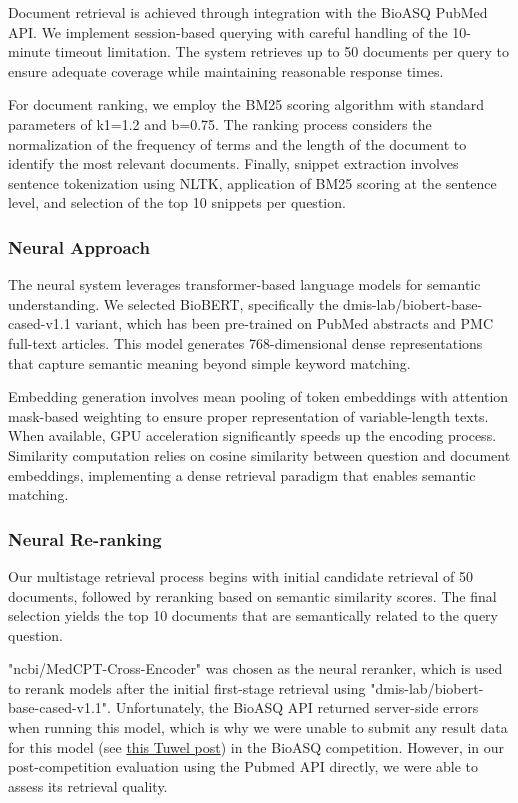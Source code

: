 \documentclass[12pt]{article}
\begin{document}
Document retrieval is achieved through integration with the BioASQ PubMed API. We implement session-based querying with careful handling of the 10-minute timeout limitation. The system retrieves up to 50 documents per query to ensure adequate coverage while maintaining reasonable response times.

For document ranking, we employ the BM25 scoring algorithm with standard parameters of k1=1.2 and b=0.75. The ranking process considers the normalization of the frequency of terms and the length of the document to identify the most relevant documents. Finally, snippet extraction involves sentence tokenization using NLTK, application of BM25 scoring at the sentence level, and selection of the top 10 snippets per question.

\subsubsection{Neural Approach}

The neural system leverages transformer-based language models for semantic understanding. We selected BioBERT, specifically the dmis-lab/biobert-base-cased-v1.1 variant, which has been pre-trained on PubMed abstracts and PMC full-text articles. This model generates 768-dimensional dense representations that capture semantic meaning beyond simple keyword matching.

Embedding generation involves mean pooling of token embeddings with attention mask-based weighting to ensure proper representation of variable-length texts. When available, GPU acceleration significantly speeds up the encoding process. Similarity computation relies on cosine similarity between question and document embeddings, implementing a dense retrieval paradigm that enables semantic matching.

\subsubsection{Neural Re-ranking}

Our multistage retrieval process begins with initial candidate retrieval of 50 documents, followed by reranking based on semantic similarity scores. The final selection yields the top 10 documents that are semantically related to the query question.

"ncbi/MedCPT-Cross-Encoder" was chosen as the neural reranker, which is used to rerank models after the initial first-stage retrieval using "dmis-lab/biobert-base-cased-v1.1". Unfortunately, the BioASQ API returned server-side errors when running this model, which is why we were unable to submit any result data for this model (see \href{https://tuwel.tuwien.ac.at/mod/forum/discuss.php?d=493679}{this Tuwel post}) in the BioASQ competition. However, in our post-competition evaluation using the Pubmed API directly, we were able to assess its retrieval quality. 
\end{document}
